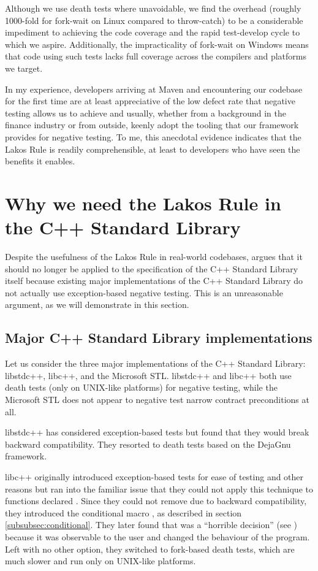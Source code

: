 Although we use death tests where unavoidable, we find the overhead (roughly 1000-fold for fork-wait on Linux compared to throw-catch) to be a considerable impediment to achieving the code coverage and the rapid test-develop cycle to which we aspire. Additionally, the impracticality of fork-wait on Windows means that code using such tests lacks full coverage across the compilers and platforms we target.

In my experience, developers arriving at Maven and encountering our codebase for the first time are at least appreciative of the low defect rate that negative testing allows us to achieve and usually, whether from a background in the finance industry or from outside, keenly adopt the tooling that our framework provides for negative testing. To me, this anecdotal evidence indicates that the Lakos Rule is readily comprehensible, at least to developers who have seen the benefits it enables.

\section{Why we need the Lakos Rule in the C++ Standard Library}
\label{sec:stdlib}

Despite the usefulness of the Lakos Rule in real-world codebases, \cite{P1656R2} argues that it should no longer be applied to the specification of the C++ Standard Library itself because existing major implementations of the C++ Standard Library do not actually use exception-based negative testing. This is an unreasonable argument, as we will demonstrate in this section.

\subsection{Major C++ Standard Library implementations}
\label{subsec:major}

Let us consider the three major implementations of the C++ Standard Library: libstdc++, libc++, and the Microsoft STL. libstdc++ and libc++ both use death tests (only on UNIX-like platforms) for negative testing, while the Microsoft STL does not appear to negative test narrow contract preconditions at all.

libstdc++ has considered exception-based tests but found that they would break backward compatibility. They resorted to death tests based on the DejaGnu framework.

libc++ originally introduced exception-based tests for ease of testing and other reasons but ran into the familiar issue that they could not apply this technique to functions declared . Since they could not remove  due to backward compatibility, they introduced the conditional  macro  , as described in section \ref{subsubsec:conditional}. They later found that  was a ``horrible decision'' (see \cite{LLVMReviewD59166}) because it was observable to the user and changed the behaviour of the program. Left with no other option, they switched to fork-based death tests, which are much slower and run only on UNIX-like platforms.


